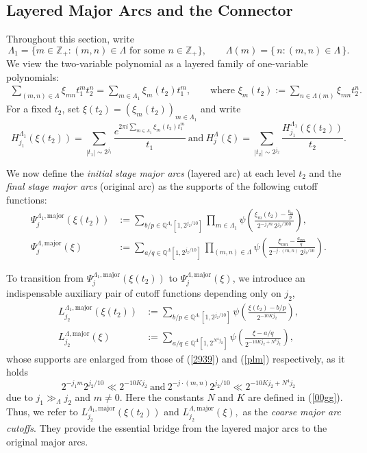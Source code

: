 \documentclass[10pt,a4paper]{amsart}
\numberwithin{equation}{section}
\begin{document}
\subsection{Layered Major Arcs and the Connector}\label{sec35}
Throughout this section,  write
\[
\Lambda_{1} = \{ m \in \mathbb{Z}_+ : (m,n) \in \Lambda \text{ for some } n\in\mathbb{Z}_{+} \},
\qquad
\Lambda(m) = \{\, n : (m,n) \in \Lambda \,\}.
\]
We view the two-variable  polynomial as a layered family of one-variable polynomials:
\begin{align}\label{t00}
	\sum_{(m,n)\in \Lambda}\xi_{mn}t_1^m t_2^n
	= \sum_{m\in \Lambda_1}  \xi_{m}(t_2)t_1^m,
	\qquad 
	\text{where } 
	\xi_m(t_2) := \sum_{n\in \Lambda(m)} \xi_{mn}t_2^n.
\end{align}
For a fixed $t_2$, set $\xi(t_2) = (\xi_m(t_2))_{m\in \Lambda_1}$ and write
\[
H^{\Lambda_1}_{j_1}(\xi(t_2))
  = \sum_{|t_1|\sim 2^{j_1}}
    \frac{e^{2\pi i \sum_{m\in \Lambda_1}\xi_m(t_2)t_1^m}}{t_1}
\ \text{and} \ 
H^{\Lambda}_j(\xi)
  = \sum_{|t_2|\sim 2^{j_2}}\frac{H^{\Lambda_1}_{j_1}(\xi(t_2))}{t_2}.
\]


We now define the \emph{initial stage major arcs} (layered arc) at each level $t_2$ and the \emph{final stage major arcs} (original arc) as the supports of the following cutoff functions:
\begin{align}
\Psi_{j}^{\Lambda_1,\mathrm{major}}(\xi(t_2))
  &:= \sum_{b/p\in \mathbb{Q}^{\Lambda_1}[1,2^{j_2/10}]}
      \prod_{m\in \Lambda_1}
      \psi\!\left(
        \frac{\xi_m(t_2)-\frac{b_m}{p}}
             {2^{-j_1 m}\,2^{j_2/100}}
      \right), \label{2939}\\[4pt]
\Psi_j^{\Lambda,\mathrm{major}}(\xi)
  &:= \sum_{a/q\in \mathbb{Q}^{\Lambda}[1,2^{j_2/10}]}
      \prod_{(m,n)\in \Lambda}
      \psi\!\left(
        \frac{\xi_{mn}-\frac{a_{mn}}{q}}
             {2^{-j\cdot (m,n)}\,2^{j_2/10}}
      \right). \label{plm}
\end{align}


To transition from 
$\Psi_j^{\Lambda_1,\mathrm{major}}(\xi(t_2))$
to 
$\Psi_j^{\Lambda,\mathrm{major}}(\xi)$, 
we introduce  an indispensable auxiliary pair of cutoff functions depending only on $j_2$,
\begin{align}\label{ccnn}
L^{\Lambda_1,\mathrm{major}}_{j_2}(\xi(t_2)) &:=\sum_{b/p\in \mathbb{Q}^{\Lambda_1}[1,2^{j_2/10}]  }  \psi\left(\frac{\xi(t_2)-b/p}{2^{- 10 Kj_2}}\right),\\
L^{\Lambda,\mathrm{major}}_{j_2}(\xi)&
  := \sum_{a/q\in \mathbb{Q}^{\Lambda}[1,2^{N^4 j_2}]}
     \psi\!\left(
       \frac{\xi - a/q}{2^{- 10K j_2 + N^4 j_2}}
     \right),\nonumber
\end{align} 
whose supports are enlarged from those of (\ref{2939}) and (\ref{plm}) respectively, as it holds  
$$2^{-j_1m}2^{j_2/10}\ll  2^{- 10 Kj_2} \ \text{and}\  2^{-j\cdot (m,n)}2^{j_2/10}\ll  2^{- 10Kj_2+N^4j_2}$$
due to $j_1\gg_{\Lambda}j_2$ and $m\ne 0$.
 Here the constants $N$ and $K$ are defined in 
(\ref{00gg}).
Thus, we refer to $L^{\Lambda_1,\mathrm{major}}_{j_2}(\xi(t_2))$ and $L^{\Lambda,\mathrm{major}}_{j_2}(\xi), $   as the \emph{coarse major arc cutoffs}.  They provide the essential bridge from the layered major arcs to the original major arcs.
\end{document}
